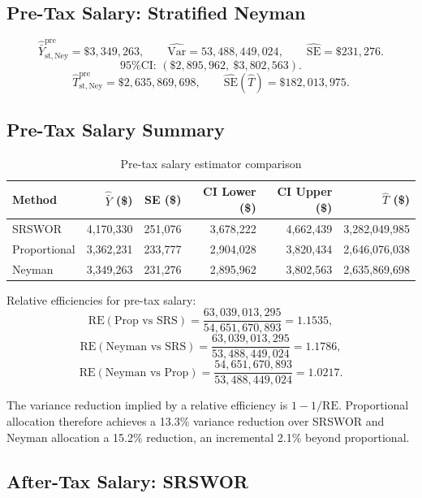 \documentclass[12pt]{article}
\newcommand{\VarHat}{\widehat{\mathrm{Var}}}
\newcommand{\SEHat}{\widehat{\mathrm{SE}}}
\begin{document}
\subsection{Pre-Tax Salary: Stratified Neyman}

\[
  \hat{\bar{Y}}_{\mathrm{st,Ney}}^{\mathrm{pre}} = \$3{,}349{,}263,
  \qquad
  \VarHat = 53{,}488{,}449{,}024,
  \qquad
  \SEHat = \$231{,}276.
\]
\[
  \text{95\% CI: } (\$2{,}895{,}962,\ \$3{,}802{,}563).
\]
\[
  \hat{T}_{\mathrm{st,Ney}}^{\mathrm{pre}} = \$2{,}635{,}869{,}698,
  \qquad
  \SEHat(\hat{T}) = \$182{,}013{,}975.
\]

\subsection{Pre-Tax Salary Summary}

\begin{table}[H]
\centering
\caption{Pre-tax salary estimator comparison}
\label{tab:pre_compare}
\begin{tabular}{lrrrrr}
\toprule
Method & $\hat{\bar{Y}}$ (\$) & SE (\$) & CI Lower (\$) & CI Upper (\$) & $\hat{T}$ (\$) \\
\midrule
SRSWOR       & 4{,}170{,}330 & 251{,}076 & 3{,}678{,}222 & 4{,}662{,}439 & 3{,}282{,}049{,}985 \\
Proportional & 3{,}362{,}231 & 233{,}777 & 2{,}904{,}028 & 3{,}820{,}434 & 2{,}646{,}076{,}038 \\
Neyman       & 3{,}349{,}263 & 231{,}276 & 2{,}895{,}962 & 3{,}802{,}563 & 2{,}635{,}869{,}698 \\
\bottomrule
\end{tabular}
\end{table}

Relative efficiencies for pre-tax salary:
\[
  \mathrm{RE}(\text{Prop vs SRS}) = \frac{63{,}039{,}013{,}295}{54{,}651{,}670{,}893} = 1.1535,
\]
\[
  \mathrm{RE}(\text{Neyman vs SRS}) = \frac{63{,}039{,}013{,}295}{53{,}488{,}449{,}024} = 1.1786,
\]
\[
  \mathrm{RE}(\text{Neyman vs Prop}) = \frac{54{,}651{,}670{,}893}{53{,}488{,}449{,}024} = 1.0217.
\]

The variance reduction implied by a relative efficiency is $1 - 1/\mathrm{RE}$.
Proportional allocation therefore achieves a 13.3\% variance reduction over SRSWOR and
Neyman allocation a 15.2\% reduction, an incremental 2.1\% beyond proportional.

\subsection{After-Tax Salary: SRSWOR}
\end{document}
